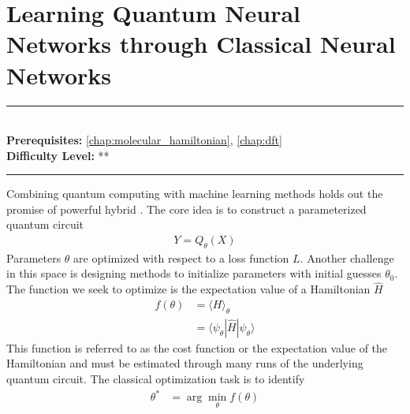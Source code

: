 \documentclass[book.tex]{subfiles}
\begin{document}
\chapter{Learning Quantum Neural Networks through Classical Neural Networks}
\label{chap:learn_quantum_nn}
\noindent\rule{11cm}{0.4pt} \\
\textbf{Prerequisites:} \autoref{chap:molecular_hamiltonian}, \autoref{chap:dft} \\
\textbf{Difficulty Level:} ** \\
\noindent\rule{11cm}{0.4pt}
\vspace{5mm}


Combining quantum computing with machine learning methods holds out the promise of powerful hybrid \cite{verdon2019learning}. The core idea is to construct a parameterized quantum circuit
\begin{align}
    Y = Q_{\theta}(X)
\end{align}
Parameters $\theta$ are optimized with respect to a loss function $L$. Another challenge in this space is designing methods to initialize parameters with initial guesses $\theta_0$. The function we seek to optimize is the expectation value of a Hamiltonian $\hat{H}$
\begin{align}
    f(\theta) &= \langle H \rangle_\theta \\
    &=\langle \psi_\theta | \hat{H} | \psi_\theta \rangle
\end{align}
This function is referred to as the cost function or the expectation value of the Hamiltonian and must be estimated through many runs of the underlying quantum circuit. The classical optimization task is to identify
\begin{align}
    \theta^* &= \arg\min_{\theta} f(\theta)
\end{align}
\end{document}
